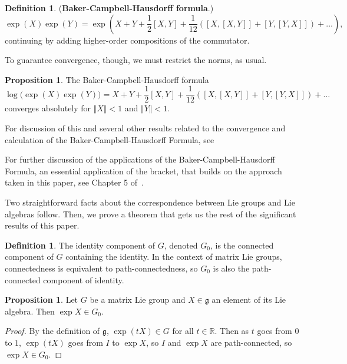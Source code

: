 \documentclass[12pt]{article}
\newcommand{\R}{\mathbb{R}}
\newcommand{\g}{\mathfrak{g}}
\newcommand{\V}{\Vert}
\theoremstyle{definition}
\newtheorem{prop}[them]{Proposition}
\theoremstyle{definition}
\theoremstyle{definition}
\theoremstyle{definition}
\theoremstyle{definition}
\newtheorem{defn}[them]{Definition}
\theoremstyle{definition}
\theoremstyle{definition}
\theoremstyle{definition}
\begin{document}
\begin{defn}
(\textbf{Baker-Campbell-Hausdorff formula}.)
\[
\exp(X)\exp(Y) = \exp(X + Y + \frac{1}{2}[X,Y] + \frac{1}{12}([X,[X,Y]] + [Y,[Y,X]]) + \hdots),
\]
continuing by adding higher-order compositions of
the commutator.
\end{defn}

\par{To guarantee convergence, though, we must
restrict the norms, as usual.}

\begin{prop}
The Baker-Campbell-Hausdorff formula
\[
\log\big(\exp(X)\exp(Y)\big) = X + Y +
\frac{1}{2}[X,Y] + \frac{1}{12}([X,[X,Y]] +
[Y,[Y,X]]) + \hdots
\] 
converges absolutely for $\V X \V < 1$ and $\V Y \V < 1$.
\end{prop}

\par{For discussion of this and several other
results related to the convergence and calculation
of the Baker-Campbell-Hausdorff Formula, see~\cite{Blanes}}

\vspace{6pt}
\par{For further discussion of the applications of
the Baker-Campbell-Hausdorff Formula, an essential
application of the bracket, that builds on the
approach taken in this paper, see Chapter 5
of~\cite{Hall}}.

\vspace{6pt}
\par{Two straightforward facts about the correspondence between Lie groups and Lie algebras follow. Then, we prove a theorem that gets us the rest of the significant results of this paper.}

\begin{defn} 
The identity component of $G$,
denoted $G_0$, is the connected component of
$G$ containing the identity. In the context of
matrix Lie groups, connectedness is equivalent
to path-connectedness, so $G_0$ is also the
path-connected component of identity.
\end{defn}
    
\begin{prop} 
Let $G$ be a matrix Lie
group and $X \in \g$ an element of its Lie algebra.
Then $\exp X \in G_0$.
\end{prop}
\begin{proof} 
By the definition of $\g$,
$\exp(tX) \in G$ for all $t \in \R$. Then as $t$
goes from $0$ to $1$, $\exp(tX)$ goes from $I$ to
$\exp X$, so $I$ and
$\exp X$ are path-connected, so $\exp X \in
G_0$.
\end{proof}
\end{document}
